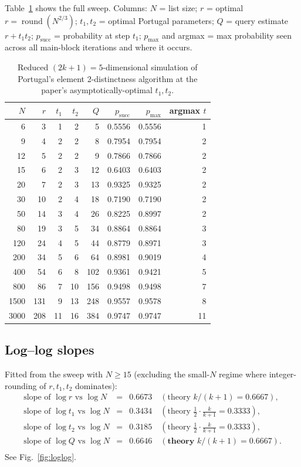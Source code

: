 \documentclass[11pt]{article}
\begin{document}
Table~\ref{tab:sweep} shows the full sweep. Columns:
$N$ = list size; $r$ = optimal $r = \operatorname{round}(N^{2/3})$;
$t_1, t_2$ = optimal Portugal parameters; $Q$ = query estimate
$r + t_1 t_2$; $p_{\text{succ}}$ = probability at step $t_1$; $p_{\max}$
and argmax = max probability seen across all main-block iterations and
where it occurs.

\begin{table}[htbp]
\centering
\begin{tabular}{rrrrrrrr}
\toprule
$N$ & $r$ & $t_1$ & $t_2$ & $Q$ & $p_{\text{succ}}$ & $p_{\max}$ & argmax $t$ \\
\midrule
6    & 3   & 1  & 2  & 5   & 0.5556 & 0.5556 & 1 \\
9    & 4   & 2  & 2  & 8   & 0.7954 & 0.7954 & 2 \\
12   & 5   & 2  & 2  & 9   & 0.7866 & 0.7866 & 2 \\
15   & 6   & 2  & 3  & 12  & 0.6403 & 0.6403 & 2 \\
20   & 7   & 2  & 3  & 13  & 0.9325 & 0.9325 & 2 \\
30   & 10  & 2  & 4  & 18  & 0.7190 & 0.7190 & 2 \\
50   & 14  & 3  & 4  & 26  & 0.8225 & 0.8997 & 2 \\
80   & 19  & 3  & 5  & 34  & 0.8864 & 0.8864 & 3 \\
120  & 24  & 4  & 5  & 44  & 0.8779 & 0.8971 & 3 \\
200  & 34  & 5  & 6  & 64  & 0.8981 & 0.9019 & 4 \\
400  & 54  & 6  & 8  & 102 & 0.9361 & 0.9421 & 5 \\
800  & 86  & 7  & 10 & 156 & 0.9498 & 0.9498 & 7 \\
1500 & 131 & 9  & 13 & 248 & 0.9557 & 0.9578 & 8 \\
3000 & 208 & 11 & 16 & 384 & 0.9747 & 0.9747 & 11 \\
\bottomrule
\end{tabular}
\caption{Reduced $(2k{+}1)=5$-dimensional simulation of Portugal's
element 2-distinctness algorithm at the paper's asymptotically-optimal
$t_1, t_2$.}
\label{tab:sweep}
\end{table}

\subsection{Log--log slopes}
Fitted from the sweep with $N \ge 15$ (excluding the small-$N$ regime
where integer-rounding of $r, t_1, t_2$ dominates):
\[
\begin{array}{lcl}
\text{slope of } \log r  \text{ vs } \log N &=& 0.6673 \quad(\text{theory } k/(k+1) = 0.6667), \\
\text{slope of } \log t_1 \text{ vs } \log N &=& 0.3434 \quad(\text{theory } \tfrac{1}{2}\cdot\tfrac{k}{k+1} = 0.3333), \\
\text{slope of } \log t_2 \text{ vs } \log N &=& 0.3185 \quad(\text{theory } \tfrac{1}{2}\cdot\tfrac{k}{k+1} = 0.3333), \\
\text{slope of } \log Q  \text{ vs } \log N &=& \mathbf{0.6646} \quad(\textbf{theory } k/(k+1) = 0.6667). \\
\end{array}
\]
See Fig.~\ref{fig:loglog}.
\end{document}

